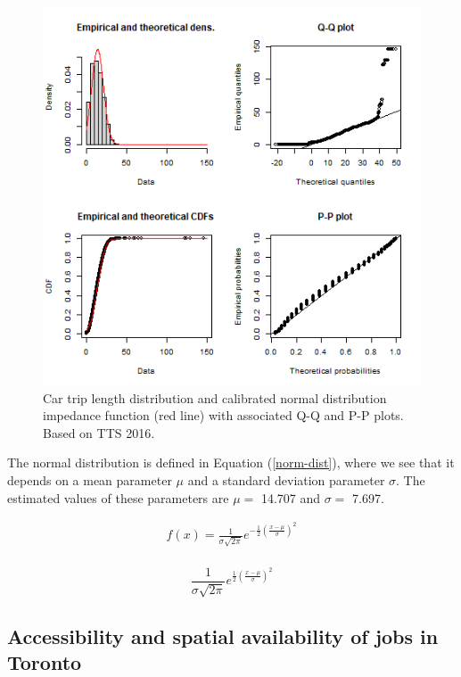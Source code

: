 \documentclass[]{elsarticle} %
\begin{document}
\begin{figure}

{\centering \includegraphics[width=0.8\linewidth]{images/impedance_function} 

}

\caption{\label{fig:TLD-norm-plot}Car trip length distribution and calibrated normal distribution impedance function (red line) with associated Q-Q and P-P plots. Based on TTS 2016.}\label{fig:TLD-norm-plot}
\end{figure}

The normal distribution is defined in Equation (\ref{norm-dist}), where
we see that it depends on a mean parameter \(\mu\) and a standard
deviation parameter \(\sigma\). The estimated values of these parameters
are \(\mu=\) 14.707 and \(\sigma =\) 7.697.

\begin{equation}
\label{norm-dist}
\begin{array}{l} 
f(x) = \frac{1}{\sigma \sqrt{2\pi}}e^{-\frac{1}{2}(\frac{x-\mu}{\sigma})^2}\\
\end{array}
\end{equation}

\[
\frac{1}{\sigma \sqrt{2\pi}}e^{\frac{1}{2}(\frac{x-\mu}{\sigma})^2}
\]

\hypertarget{accessibility-and-spatial-availability-of-jobs-in-toronto}{%
\subsection{Accessibility and spatial availability of jobs in
Toronto}\label{accessibility-and-spatial-availability-of-jobs-in-toronto}}
\end{document}
